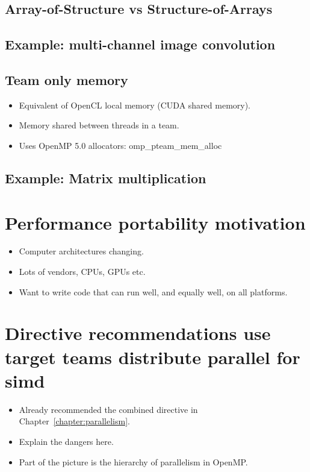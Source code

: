\subsection{Array-of-Structure vs Structure-of-Arrays}
\subsection{Example: multi-channel image convolution}

\subsection{Team only memory}
\begin{itemize}
  \item Equivalent of OpenCL local memory (CUDA shared memory).
  \item Memory shared between threads in a team.
  \item Uses OpenMP 5.0 allocators: omp\_pteam\_mem\_alloc
\end{itemize}
\subsection{Example: Matrix multiplication}

\section{Performance portability motivation}
\begin{itemize}
  \item Computer architectures changing.
  \item Lots of vendors, CPUs, GPUs etc.
  \item Want to write code that can run well, and equally well, on all platforms.
\end{itemize}


\section{Directive recommendations use target teams distribute parallel for simd}
\begin{itemize}
  \item Already recommended the combined directive in Chapter~\ref{chapter:parallelism}.
  \item Explain the dangers here.
  \item Part of the picture is the hierarchy of parallelism in OpenMP.
\end{itemize}

